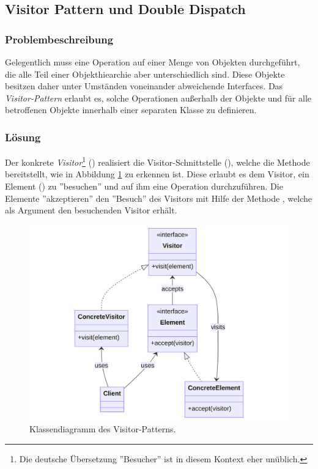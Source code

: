 \subsection{Visitor Pattern und Double Dispatch}


\subsubsection*{Problembeschreibung}

Gelegentlich muss eine Operation auf einer Menge von Objekten durchgeführt, die alle Teil einer Objekthiearchie aber unterschiedlich sind. Diese Objekte besitzen daher unter Umständen voneinander abweichende Interfaces. Das \emph{Visitor-Pattern} erlaubt es, solche Operationen außerhalb der Objekte und für alle betroffenen Objekte innerhalb einer separaten Klasse zu definieren. \cite{gamma_design_1995}

\subsubsection*{Lösung}

Der konkrete \emph{Visitor}\footnote{Die deutsche Übersetzung ''Besucher'' ist in diesem Kontext eher unüblich.} () realisiert die Visitor-Schnittstelle (), welche die Methode  bereitstellt, wie in Abbildung \ref{fig:visitor-class} zu erkennen ist. Diese erlaubt es dem Visitor, ein Element () zu ''besuchen'' und auf ihm eine Operation durchzuführen. Die Elemente ''akzeptieren'' den ''Besuch'' des Visitors mit Hilfe der Methode , welche als Argument den besuchenden Visitor erhält.

\begin{figure}[H]
	\centering
	\includegraphics[width=0.75\linewidth]{images/patterns/visitor-class.png}
	\caption{Klassendiagramm des Visitor-Patterns. \cite{skobeleva_visitor_2023}}
	\label{fig:visitor-class}
\end{figure}


